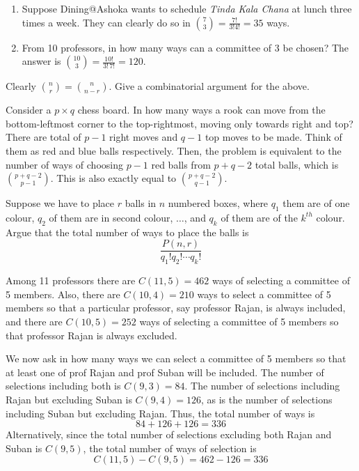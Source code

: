 \begin{example}
\begin{enumerate}
\item Suppose Dining@Ashoka wants to schedule \emph{Tinda Kala Chana} at lunch three times a week. They can clearly do so in $\binom{7}{3} =  \frac{7!}{3!4!} = 35$ ways.
\item From 10 professors, in how many ways can a committee of 3 be chosen? The answer is $\binom{10}{3} = \frac{10!}{3! \, 7!} = 120$.
\end{enumerate}
\end{example}

\begin{exercise}
Clearly $\binom{n}{r} = \binom{n}{n-r}$. Give a combinatorial argument for the above.
 \end{exercise}
 \begin{example}
 \label{ex:rook}
Consider a $p \times q$ chess board. In how many ways a rook can move from the bottom-leftmost corner to the top-rightmost, moving only towards right and top? There are total  of $p-1$ right moves and $q-1$ top moves to be made. Think of them as red and blue balls respectively. Then, the problem is equivalent to the number of ways of choosing $p-1$ red balls from $p+q-2$ total balls, which is $\binom{p+q-2}{p-1}$. This is also exactly equal to $\binom{p+q-2}{q-1}$.
\end{example}


\begin{exercise}
Suppose we have to place $r$ balls in $n$ numbered boxes, where $q_1$ them are of one colour, $q_2$ of them are in second colour, $\ldots$, and $q_k$ of them are of the $k^{th}$ colour. Argue that the total number of ways to place the balls is
\[
\frac{P(n,r)}{q_1! q_2! \cdots q_k!}
\]
\end{exercise}

\begin{example}
\label{ex:rajan-suban}
Among 11 professors there are $C(11,5) = 462$ ways of selecting a committee of 5 members. Also, there are $C(10,4) = 210$ ways to select a committee of 5 members so that a particular professor, say professor Rajan, is always included, and there are $C(10,5) = 252$ ways of selecting a committee of 5 members so that professor Rajan is always excluded.  

We now ask in how many ways we can select a committee of 5 members so that at least one of prof Rajan and prof Suban will be included. The number of selections including both is $C(9,3) = 84$. The number of selections including Rajan but excluding Suban is $C(9,4) = 126$, as is the number of selections including Suban but excluding Rajan. Thus, the total number of ways is
\[
84+126+126 = 336
\]
Alternatively, since the total number of selections excluding both Rajan and Suban is $C(9,5)$, the total number of ways of selection is
\[
C(11,5) - C(9,5) = 462 - 126 = 336
\]
\end{example}

